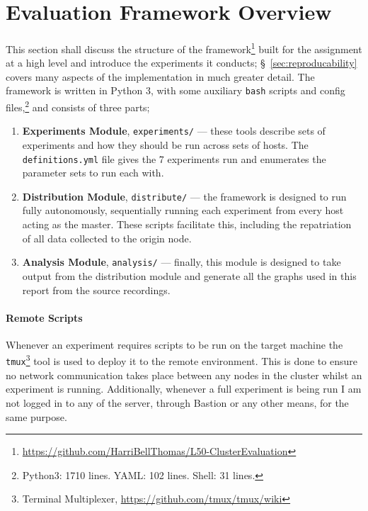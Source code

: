 \documentclass[a4paper,10pt]{article}
\begin{document}
\section{Evaluation Framework Overview}

\paragraph{} This section shall discuss the structure of the framework\footnote{\url{https://github.com/HarriBellThomas/L50-ClusterEvaluation}} built for the assignment at a high level and introduce the experiments it conducts; §~\ref{sec:reproducability} covers many aspects of the implementation in much greater detail. The framework is written in Python 3, with some auxiliary \texttt{bash} scripts and config files,\footnote{Python3: 1710 lines. YAML: 102 lines. Shell: 31 lines.} and consists of three parts;
\begin{enumerate}
    \item \textbf{Experiments Module}, \texttt{experiments/} --- these tools describe sets of experiments and how they should be run across sets of hosts. The \texttt{definitions.yml} file gives the 7 experiments run and enumerates the parameter sets to run each with.
    \item \textbf{Distribution Module}, \texttt{distribute/} --- the framework is designed to run fully autonomously, sequentially running each experiment from every host acting as the master. These scripts facilitate this, including the repatriation of all data collected to the origin node.
    \item \textbf{Analysis Module}, \texttt{analysis/} --- finally, this module is designed to take output from the distribution module and generate all the graphs used in this report from the source recordings.
\end{enumerate}

\paragraph{Remote Scripts} Whenever an experiment requires scripts to be run on the target machine the \texttt{tmux}\footnote{Terminal Multiplexer, \url{https://github.com/tmux/tmux/wiki}} tool is used to deploy it to the remote environment. This is done to ensure no network communication takes place between any nodes in the cluster whilst an experiment is running. Additionally, whenever a full experiment is being run I am not logged in to any of the server, through Bastion or any other means, for the same purpose.
\end{document}
